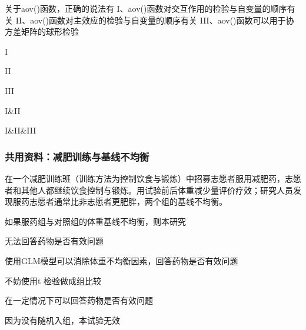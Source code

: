 \par\addvspace{6pt}\noindent\begin{minipage}{\linewidth}


关于aov()函数，正确的说法有 I、aov()函数对交互作用的检验与自变量的顺序有关 II、aov()函数对主效应的检验与自变量的顺序有关 III、aov()函数可以用于协方差矩阵的球形检验


\begin{choices}

\item I

\item II

\item III

\item I\&II

\item I\&II\&III

\end{choices}

\end{minipage}\par\vspace{4pt}

\subsubsection*{共用资料：减肥训练与基线不均衡}

在一个减肥训练班（训练方法为控制饮食与锻炼）中招募志愿者服用减肥药，志愿者和其他人都继续饮食控制与锻炼。用试验前后体重减少量评价疗效；研究人员发现服药志愿者通常比非志愿者更肥胖，两个组的基线不均衡。


\par\addvspace{6pt}\noindent\begin{minipage}{\linewidth}


如果服药组与对照组的体重基线不均衡，则本研究


\begin{choices}

\item 无法回答药物是否有效问题

\item 使用GLM模型可以消除体重不均衡因素，回答药物是否有效问题

\item 不妨使用t 检验做成组比较

\item 在一定情况下可以回答药物是否有效问题

\item 因为没有随机入组，本试验无效

\end{choices}

\end{minipage}\par\vspace{4pt}

